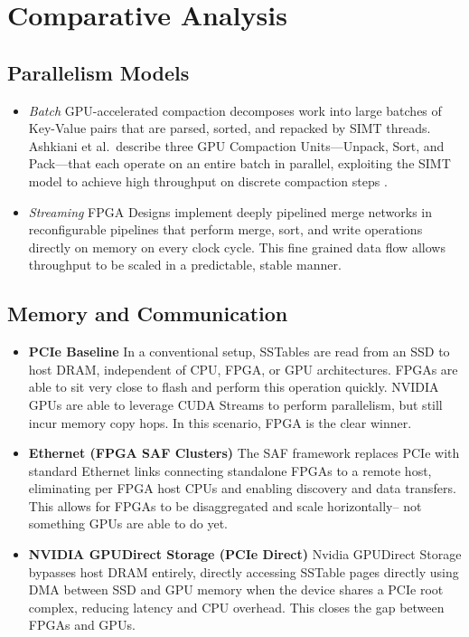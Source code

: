 \documentclass[sigconf]{acmart}
\begin{document}
\section{Comparative Analysis}
\label{sec:compate}
  \subsection{Parallelism Models}
    \begin{itemize}
      \item \emph{Batch}
      GPU-accelerated compaction decomposes work into large batches of Key-Value pairs that are parsed, sorted, and repacked by SIMT threads.  Ashkiani et al.\ describe three GPU Compaction Units—Unpack, Sort, and Pack—that each operate on an entire batch in parallel, exploiting the SIMT model to achieve high throughput on discrete compaction steps \cite{ashkiani2018gpu}.
      \item \emph{Streaming}
      FPGA Designs implement deeply pipelined merge networks in reconfigurable pipelines that perform merge, sort, and write operations directly on memory on every clock cycle. This fine grained data flow allows throughput to be scaled in a predictable, stable manner. 
    \end{itemize}
  \subsection{Memory and Communication}
    \begin{itemize}
      \item \textbf{PCIe Baseline}
        In a conventional setup, SSTables are read from an SSD to host DRAM, independent of CPU, FPGA, or GPU architectures. FPGAs are able to sit very close to flash and perform this operation quickly. NVIDIA GPUs are able to leverage CUDA Streams to perform parallelism, but still incur memory copy hops. In this scenario, FPGA is the clear winner.
      \item \textbf{Ethernet (FPGA SAF Clusters)}
        The SAF framework replaces PCIe with standard Ethernet links connecting standalone FPGAs to a remote host, eliminating per FPGA host CPUs and enabling discovery and data transfers. This allows for FPGAs to be disaggregated and scale horizontally-- not something GPUs are able to do yet. 
      \item \textbf{NVIDIA GPUDirect Storage (PCIe Direct)}
        Nvidia GPUDirect Storage bypasses host DRAM entirely, directly accessing SSTable pages directly using DMA between SSD and GPU memory when the device shares a PCIe root complex, reducing latency and CPU overhead. This closes the gap between FPGAs and GPUs.

    \end{itemize}
\end{document}
